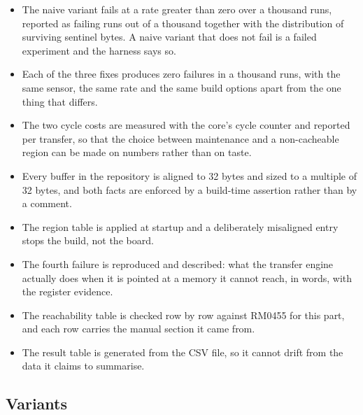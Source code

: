 \begin{itemize}
\item The naive variant fails at a rate greater than zero over a thousand runs,
reported as failing runs out of a thousand together with the distribution of
surviving sentinel bytes. A naive variant that does not fail is a failed
experiment and the harness says so.
\item Each of the three fixes produces zero failures in a thousand runs, with
the same sensor, the same rate and the same build options apart from the one
thing that differs.
\item The two cycle costs are measured with the core's cycle counter and
reported per transfer, so that the choice between maintenance and a
non-cacheable region can be made on numbers rather than on taste.
\item Every buffer in the repository is aligned to 32 bytes and sized to a
multiple of 32 bytes, and both facts are enforced by a build-time assertion
rather than by a comment.
\item The region table is applied at startup and a deliberately misaligned
entry stops the build, not the board.
\item The fourth failure is reproduced and described: what the transfer engine
actually does when it is pointed at a memory it cannot reach, in words, with
the register evidence.
\item The reachability table is checked row by row against RM0455 for this
part, and each row carries the manual section it came from.
\item The result table is generated from the CSV file, so it cannot drift from
the data it claims to summarise.
\end{itemize}

\subsection*{Variants}

